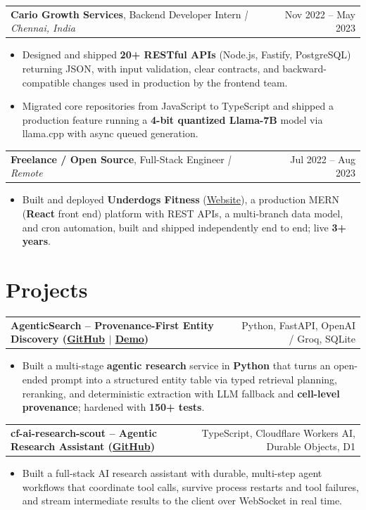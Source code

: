 \documentclass[letterpaper,11pt]{article}
\makeatletter
\newcommand{\expItem}[4]{%
  \vspace{3pt}
  \begin{tabular*}{\textwidth}{@{}l@{\extracolsep{\fill}}r@{}}
    \textbf{#1}, #2 \textit{| #3} & #4 \\
  \end{tabular*}\par\vspace{-2pt}
}
\newcommand{\projItem}[2]{%
  \vspace{6pt}
  \begin{tabular*}{\textwidth}{@{}l@{\extracolsep{\fill}}r@{}}
    \textbf{#1} & #2 \\
  \end{tabular*}\par\vspace{-2pt}
}
\makeatother
\begin{document}
\expItem{Cario Growth Services}{Backend Developer Intern}{Chennai, India}{Nov 2022 -- May 2023}
\begin{itemize}
  \item Designed and shipped \textbf{20+ RESTful APIs} (Node.js, Fastify, PostgreSQL) returning JSON, with input validation, clear contracts, and backward-compatible changes used in production by the frontend team.
  \item Migrated core repositories from JavaScript to TypeScript and shipped a production feature running a \textbf{4-bit quantized Llama-7B} model via llama.cpp with async queued generation.
\end{itemize}

\expItem{Freelance / Open Source}{Full-Stack Engineer}{Remote}{Jul 2022 -- Aug 2023}
\begin{itemize}
  \item Built and deployed \textbf{Underdogs Fitness} (\href{https://www.underdogsfitness.in/}{Website}), a production MERN (\textbf{React} front end) platform with REST APIs, a multi-branch data model, and cron automation, built and shipped independently end to end; live \textbf{3+ years}.
\end{itemize}

\section{Projects}

\projItem{AgenticSearch -- Provenance-First Entity Discovery {\normalfont\small(\href{https://github.com/Deva-1903/ciir_agentic_search}{GitHub} $\vert$ \href{https://agentic-search-negglszkwa-uc.a.run.app}{Demo})}}{Python, FastAPI, OpenAI / Groq, SQLite}
\begin{itemize}
  \item Built a multi-stage \textbf{agentic research} service in \textbf{Python} that turns an open-ended prompt into a structured entity table via typed retrieval planning, reranking, and deterministic extraction with LLM fallback and \textbf{cell-level provenance}; hardened with \textbf{150+ tests}.
\end{itemize}

\projItem{cf-ai-research-scout -- Agentic Research Assistant {\normalfont\small(\href{https://github.com/Deva-1903/cf_ai_research_scout}{GitHub})}}{TypeScript, Cloudflare Workers AI, Durable Objects, D1}
\begin{itemize}
  \item Built a full-stack AI research assistant with durable, multi-step agent workflows that coordinate tool calls, survive process restarts and tool failures, and stream intermediate results to the client over WebSocket in real time.
\end{itemize}
\end{document}
